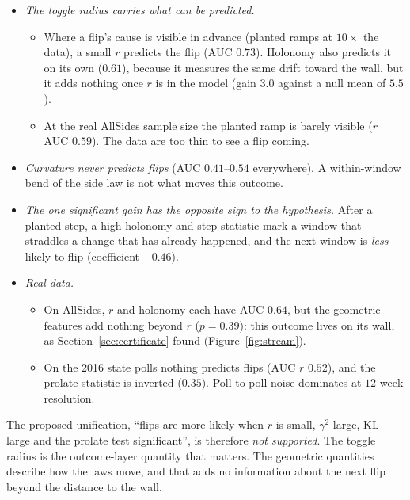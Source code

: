 \documentclass[11pt]{article}
\theoremstyle{definition}
\theoremstyle{remark}
\begin{document}
\begin{itemize}
  \item \emph{The toggle radius carries what can be predicted.}
  \begin{itemize}
    \item Where a flip's cause is visible in advance (planted ramps at $10\times$ the data), a small $r$ predicts the flip (AUC $0.73$). Holonomy also predicts it on its own ($0.61$), because it measures the same drift toward the wall, but it adds nothing once $r$ is in the model (gain $3.0$ against a null mean of $5.5$).
    \item At the real AllSides sample size the planted ramp is barely visible ($r$ AUC $0.59$). The data are too thin to see a flip coming.
  \end{itemize}
  \item \emph{Curvature never predicts flips} (AUC $0.41$--$0.54$ everywhere). A within-window bend of the side law is not what moves this outcome.
  \item \emph{The one significant gain has the opposite sign to the hypothesis.} After a planted step, a high holonomy and step statistic mark a window that straddles a change that has already happened, and the next window is \emph{less} likely to flip (coefficient $-0.46$).
  \item \emph{Real data.}
  \begin{itemize}
    \item On AllSides, $r$ and holonomy each have AUC $0.64$, but the geometric features add nothing beyond $r$ ($p=0.39$): this outcome lives on its wall, as Section~\ref{sec:certificate} found (Figure~\ref{fig:stream}).
    \item On the 2016 state polls nothing predicts flips (AUC $r$ $0.52$), and the prolate statistic is inverted ($0.35$). Poll-to-poll noise dominates at $12$-week resolution.
  \end{itemize}
\end{itemize}
The proposed unification, ``flips are more likely when $r$ is small, $\gamma^2$ large, KL large and the prolate test significant'', is therefore \emph{not supported}. The toggle radius is the outcome-layer quantity that matters. The geometric quantities describe how the laws move, and that adds no information about the next flip beyond the distance to the wall.
\end{document}
